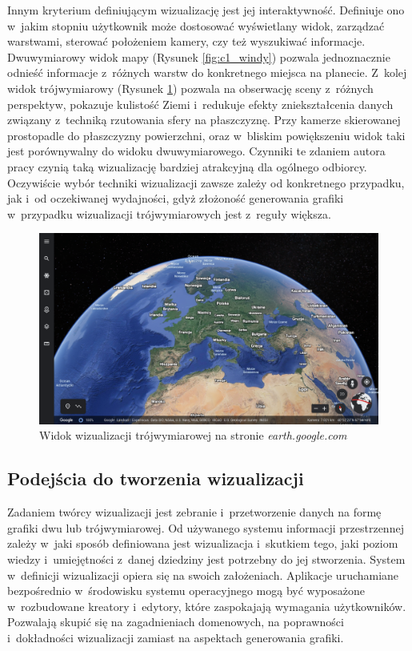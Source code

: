Innym kryterium definiującym wizualizację jest jej interaktywność. Definiuje ono w~jakim stopniu użytkownik może dostosować wyświetlany widok, zarządzać warstwami, sterować położeniem kamery, czy też wyszukiwać informacje. Dwuwymiarowy widok mapy (Rysunek \ref{fig:c1_windy}) pozwala jednoznacznie odnieść informacje z~różnych warstw do konkretnego miejsca na planecie. Z~kolej widok trójwymiarowy (Rysunek \ref{fig:c1_google_earth}) pozwala na obserwację sceny z~różnych perspektyw, pokazuje kulistość Ziemi i~redukuje efekty zniekształcenia danych związany z~techniką rzutowania sfery na płaszczyznę. Przy kamerze skierowanej prostopadle do płaszczyzny powierzchni, oraz w~bliskim powiększeniu widok taki jest porównywalny do widoku dwuwymiarowego. Czynniki te zdaniem autora pracy czynią taką wizualizację bardziej atrakcyjną dla ogólnego odbiorcy. Oczywiście wybór techniki wizualizacji zawsze zależy od konkretnego przypadku, jak i~od oczekiwanej wydajności, gdyż złożoność generowania grafiki w~przypadku wizualizacji trójwymiarowych jest z~reguły większa.


\begin{figure}[h]
    \centering
    \includegraphics[width=\linewidth]{img/c1_google_earth.png}
    \caption{Widok wizualizacji trójwymiarowej na stronie \textit{earth.google.com}}
    \label{fig:c1_google_earth}
\end{figure}

\subsection{Podejścia do tworzenia wizualizacji}

Zadaniem twórcy wizualizacji jest zebranie i~przetworzenie danych na formę grafiki dwu lub trójwymiarowej. Od używanego systemu informacji przestrzennej zależy w~jaki sposób definiowana jest wizualizacja i~skutkiem tego, jaki poziom wiedzy i~umiejętności z~danej dziedziny jest potrzebny do jej stworzenia. System w~definicji wizualizacji opiera się na swoich założeniach. Aplikacje uruchamiane bezpośrednio w~środowisku systemu operacyjnego mogą być wyposażone w~rozbudowane kreatory i~edytory, które zaspokajają wymagania użytkowników. Pozwalają skupić się na zagadnieniach domenowych, na poprawności i~dokładności wizualizacji zamiast na aspektach generowania grafiki. 

